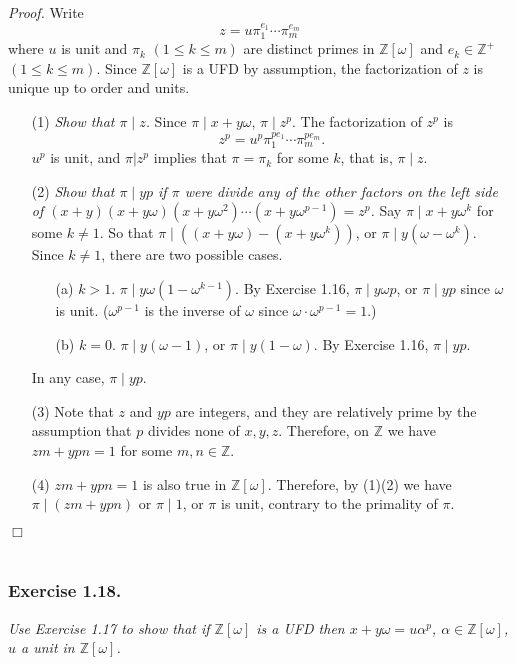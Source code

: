 \documentclass{article}
\begin{document}
\emph{Proof.}
Write $$z = u {\pi}_1^{e_1} \cdots {\pi}_m^{e_m}$$ where
$u$ is unit and $\pi_k$ $(1 \leq k \leq m)$ are distinct primes in $\mathbb{Z}[\omega]$ and
$e_k \in \mathbb{Z}^+$ $(1 \leq k \leq m)$.
Since $\mathbb{Z}[\omega]$ is a UFD by assumption,
the factorization of $z$ is unique up to order and units.
\begin{enumerate}
\item[(1)]
\emph{Show that $\pi \mid z$.}
Since $\pi \mid x + y\omega$, $\pi \mid z^p$.
The factorization of $z^p$ is
$$z^p = u^p {\pi}_1^{pe_1} \cdots {\pi}_m^{pe_m}.$$
$u^p$ is unit, and $\pi | z^p$ implies that $\pi = \pi_k$ for some $k$,
that is, $\pi \mid z$.
\item[(2)]
\emph{Show that $\pi \mid yp$ if $\pi$ were divide any of
the other factors on the left side of
$(x+y)(x+y\omega)(x+y\omega^2) \cdots (x+y\omega^{p-1}) = z^p$.}
Say $\pi \mid x+y\omega^k$ for some $k \neq 1$.
So that $\pi \mid ((x+y\omega) - (x+y\omega^k))$,
or $\pi \mid y(\omega - \omega^k)$.
Since $k \neq 1$, there are two possible cases.
  \begin{enumerate}
  \item[(a)]
  $k > 1$. $\pi \mid y\omega(1 - \omega^{k-1})$.
  By Exercise 1.16, $\pi \mid y\omega p$, or $\pi \mid yp$ since $\omega$ is unit.
  ($\omega^{p-1}$ is the inverse of $\omega$ since $\omega \cdot \omega^{p-1} = 1$.)
  \item[(b)]
  $k = 0$. $\pi \mid y(\omega - 1)$, or $\pi \mid y(1 - \omega)$.
  By Exercise 1.16, $\pi \mid yp$.
  \end{enumerate}
In any case, $\pi \mid yp$.
\item[(3)]
Note that $z$ and $yp$ are integers, and they are relatively prime by the assumption
that $p$ divides none of $x, y, z$.
Therefore, on $\mathbb{Z}$ we have $zm + ypn = 1$ for some $m, n \in \mathbb{Z}$.
\item[(4)]
$zm + ypn = 1$ is also true in $\mathbb{Z}[\omega]$.
Therefore, by (1)(2) we have $\pi \mid (zm + ypn)$ or $\pi \mid 1$,
or $\pi$ is unit, contrary to the primality of $\pi$.
\end{enumerate}
$\Box$ \\\\






\subsubsection*{Exercise 1.18.}
\emph{Use Exercise 1.17 to show that if $\mathbb{Z}[\omega]$ is a UFD then
$x+y\omega = u\alpha^p$, $\alpha \in \mathbb{Z}[\omega]$,
$u$ a unit in $\mathbb{Z}[\omega]$. } \\
\end{document}
